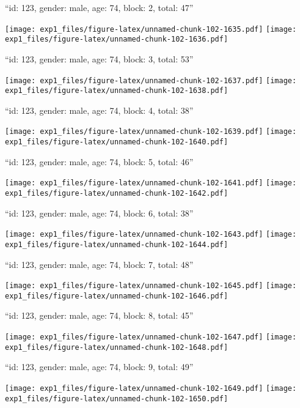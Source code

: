 \documentclass[11pt,,]{article}
\begin{document}
\newpage
[1] 

``id: 123, gender: male, age: 74, block: 2, total: 47''

\texttt{[image: exp1\_files/figure-latex/unnamed-chunk-102-1635.pdf]}
\texttt{[image: exp1\_files/figure-latex/unnamed-chunk-102-1636.pdf]}

\newpage
[1] 

``id: 123, gender: male, age: 74, block: 3, total: 53''

\texttt{[image: exp1\_files/figure-latex/unnamed-chunk-102-1637.pdf]}
\texttt{[image: exp1\_files/figure-latex/unnamed-chunk-102-1638.pdf]}

\newpage
[1] 

``id: 123, gender: male, age: 74, block: 4, total: 38''

\texttt{[image: exp1\_files/figure-latex/unnamed-chunk-102-1639.pdf]}
\texttt{[image: exp1\_files/figure-latex/unnamed-chunk-102-1640.pdf]}

\newpage
[1] 

``id: 123, gender: male, age: 74, block: 5, total: 46''

\texttt{[image: exp1\_files/figure-latex/unnamed-chunk-102-1641.pdf]}
\texttt{[image: exp1\_files/figure-latex/unnamed-chunk-102-1642.pdf]}

\newpage
[1] 

``id: 123, gender: male, age: 74, block: 6, total: 38''

\texttt{[image: exp1\_files/figure-latex/unnamed-chunk-102-1643.pdf]}
\texttt{[image: exp1\_files/figure-latex/unnamed-chunk-102-1644.pdf]}

\newpage
[1] 

``id: 123, gender: male, age: 74, block: 7, total: 48''

\texttt{[image: exp1\_files/figure-latex/unnamed-chunk-102-1645.pdf]}
\texttt{[image: exp1\_files/figure-latex/unnamed-chunk-102-1646.pdf]}

\newpage
[1] 

``id: 123, gender: male, age: 74, block: 8, total: 45''

\texttt{[image: exp1\_files/figure-latex/unnamed-chunk-102-1647.pdf]}
\texttt{[image: exp1\_files/figure-latex/unnamed-chunk-102-1648.pdf]}

\newpage
[1] 

``id: 123, gender: male, age: 74, block: 9, total: 49''

\texttt{[image: exp1\_files/figure-latex/unnamed-chunk-102-1649.pdf]}
\texttt{[image: exp1\_files/figure-latex/unnamed-chunk-102-1650.pdf]}
\end{document}
